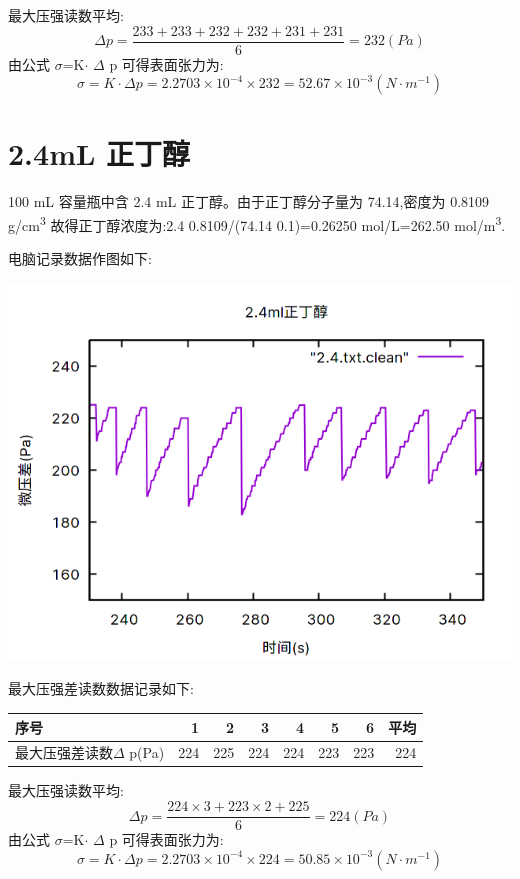 \documentclass[11pt]{report}
\begin{document}
最大压强读数平均:
\[
    \Delta p =\frac{233+233+232+232+231+231}{6}=232(Pa)
    \]
由公式 \(\sigma\)=K\(\cdot\) \(\Delta\) p 可得表面张力为:
\[
    \sigma=K\cdot \Delta p=2.2703\times 10^{-4}\times 232=52.67\times 10^{-3}(N\cdot m^{-1})
    \]

\section{2.4mL 正丁醇}
\label{sec:org05c7c87}
    100 mL 容量瓶中含 2.4 mL 正丁醇。由于正丁醇分子量为 74.14,密度为 0.8109 g/cm\textsuperscript{3}
故得正丁醇浓度为:2.4\texttimes{} 0.8109/(74.14\texttimes{} 0.1)=0.26250 mol/L=262.50 mol/m\textsuperscript{3}.

电脑记录数据作图如下:
\begin{center}
\includegraphics[width=.9\linewidth]{../img/2.4.png}
\end{center}

最大压强差读数数据记录如下:
\begin{center}
\begin{tabular}{lrrrrrrr}
序号 & 1 & 2 & 3 & 4 & 5 & 6 & 平均\\
\hline
最大压强差读数\(\Delta\) p(Pa) & 224 & 225 & 224 & 224 & 223 & 223 & 224\\
\end{tabular}
\end{center}

最大压强读数平均:
\[
    \Delta p =\frac{224\times 3+223\times 2+225}{6}=224(Pa)
    \]
由公式 \(\sigma\)=K\(\cdot\) \(\Delta\) p 可得表面张力为:
\[
    \sigma=K\cdot \Delta p=2.2703\times 10^{-4}\times 224=50.85\times 10^{-3}(N\cdot m^{-1})
    \]
\end{document}
